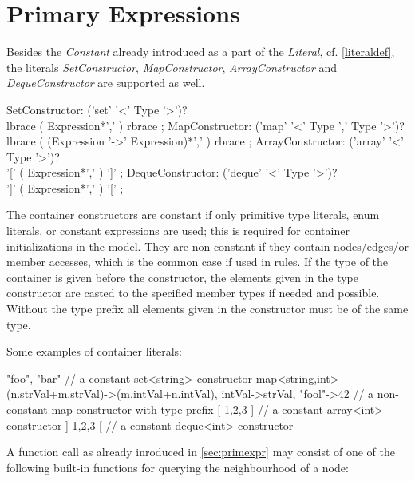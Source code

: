 \section{Primary Expressions}\label{sec:containerprimexpr}

Besides the \emph{Constant} already introduced as a part of the \emph{Literal}, cf. \ref{literaldef}, the literals \emph{SetConstructor}, \emph{MapConstructor}, \emph{ArrayConstructor} and \emph{DequeConstructor} are supported as well.

\begin{rail}
  SetConstructor: ('set' '<' Type '>')? \\ lbrace ( Expression*',' ) rbrace ;
  MapConstructor: ('map' '<' Type ',' Type '>')? \\ lbrace ( (Expression '->' Expression)*',' ) rbrace ;
  ArrayConstructor: ('array' '<' Type '>')? \\ '[' ( Expression*',' ) ']' ;
  DequeConstructor: ('deque' '<' Type '>')? \\ ']' ( Expression*',' ) '[' ;
\end{rail}

The container constructors are constant if only primitive type literals, enum literals, or constant expressions are used; this is required for container initializations in the model.
They are non-constant if they contain nodes/edges/or member accesses, which is the common case if used in rules.
If the type of the container is given before the constructor, the elements given in the type constructor are casted to the specified member types if needed and possible.
Without the type prefix all elements given in the constructor must be of the same type.

\begin{example}
Some examples of container literals:
\begin{grgen}
{ "foo", "bar" } // a constant set<string> constructor
map<string,int>{ (n.strVal+m.strVal)->(m.intVal+n.intVal), intVal->strVal, "fool"->42 } // a non-constant map constructor with type prefix
[ 1,2,3 ] // a constant array<int> constructor
] 1,2,3 [ // a constant deque<int> constructor
\end{grgen}
\end{example}

A function call as already inroduced in \ref{sec:primexpr} may consist of one of the following built-in functions for querying the neighbourhood of a node:

